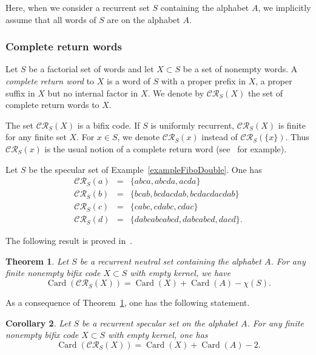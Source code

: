 \documentclass[preprint,12pt]{elsarticle}
\newtheorem{theorem}{Theorem}
\newtheorem{corollary}[theorem]{Corollary}
{\theorembodyfont{\rmfamily}\newtheorem{example}[theorem]{Example}
  \newtheorem{remark}[theorem]{Remark} }
\newcommand\CR{\mathcal{CR}}
\DeclareMathOperator{\Card}{Card}
\numberwithin{theorem}{section}
\numberwithin{equation}{section}
\numberwithin{figure}{section}
\numberwithin{table}{section}
\begin{document}
Here, when we consider a recurrent set $S$ containing the alphabet $A$, we implicitly assume that all words of $S$ are on the alphabet $A$.

\subsubsection{Complete return words}
Let $S$ be a factorial set of words and let $X \subset S$ be a set of nonempty words.
A \emph{complete return word} to $X$ is a word of $S$ with a proper prefix in $X$, a proper suffix in $X$ but no internal factor in $X$.
We denote by $\CR_S(X)$ the set of complete return words to $X$.

The set $\CR_S(X)$ is a bifix code.
If $S$ is uniformly recurrent, $\CR_S(X)$ is finite for any finite set $X$.
For $x\in S$, we denote $\CR_S(x)$ instead of $\CR_S(\{x\})$.
Thus $\CR_S(x)$ is the usual notion of a complete return word (see~\cite{Durand1998} for example).

\begin{example}
\label{exampleCompleteFiboDouble}
Let $S$ be the specular set of Example~\ref{exampleFiboDouble}.
One has
\begin{eqnarray*}
\CR_S(a)&=&\{abca,abcda,acda\}\\
\CR_S(b)&=&\{bcab,bcdacdab,bcdacdacdab\}\\
\CR_S(c)&=&\{cabc,cdabc,cdac\}\\
\CR_S(d)&=&\{dabcabcabcd,dabcabcd,dacd\}.
\end{eqnarray*}
\end{example}

The following result is proved in~\cite[Theorem 5.2]{DolcePerrin2016}.

\begin{theorem}
\label{propositionNew}
Let $S$ be a recurrent neutral set containing the alphabet $A$.
For any finite nonempty bifix code $X \subset S$ with empty kernel, we have
\begin{equation}
\Card(\CR_S(X)) = \Card(X)+\Card(A)-\chi(S).
\label{formulaComplete}
\end{equation}
\end{theorem}

As a consequence of Theorem~\ref{propositionNew}, one has the following statement. 

\begin{corollary}
\label{corollaryCardCompleteReturns}
Let $S$ be a recurrent specular set on the alphabet $A$.
For any finite nonempty bifix code $X\subset S$ with empty kernel, one has
\begin{displaymath}
\Card(\CR_S(X)) = \Card(X)+\Card(A)-2.
\end{displaymath}
\end{corollary}
\end{document}
